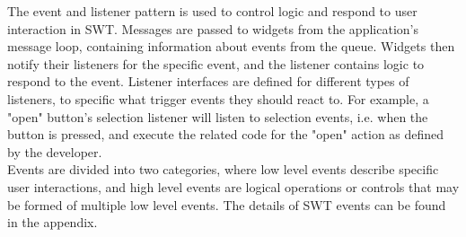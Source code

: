 The event and listener pattern is used to control logic and respond to user interaction in SWT. Messages are passed to widgets from the application's message loop, containing information about events from the queue. Widgets then notify their listeners for the specific event, and the listener contains logic to respond to the event. Listener interfaces are defined for different types of listeners, to specific what trigger events they should react to. For example, a "open" button's selection listener will listen to selection events, i.e. when the button is pressed, and execute the related code for the "open" action as defined by the developer.\\
Events are divided into two categories, where low level events describe specific user interactions, and high level events are logical operations or controls that may be formed of multiple low level events. \cite{swtevent} The details of SWT events can be found in the appendix.